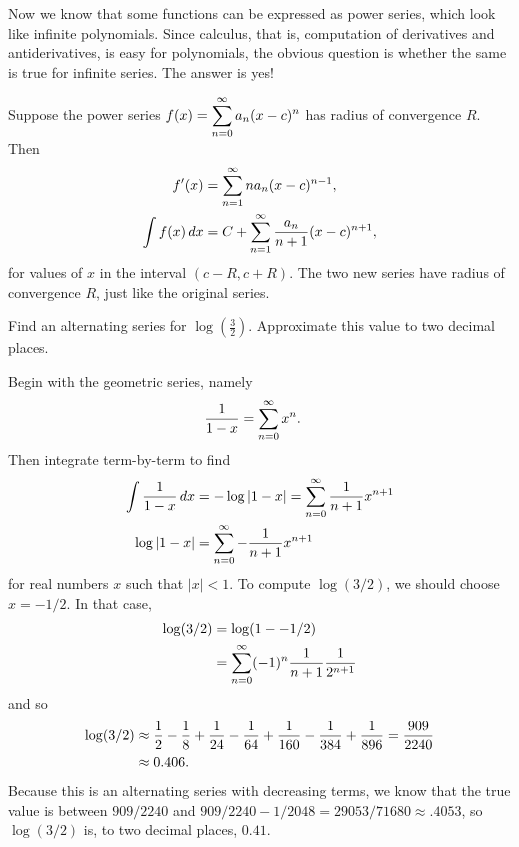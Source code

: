 \nobreak
Now we know that some functions can be expressed as power series,
which look like infinite polynomials. Since calculus, that is,
computation of derivatives and antiderivatives, is easy for
polynomials, the obvious question is whether the same is true
for infinite series. The answer is yes!

\begin{theorem}\label{thm:term-by-term-calculus}
Suppose the power series $f(x)=\displaystyle\sum_{n=0}^\infty a_n(x-c)^n$ has
radius of convergence $R$. Then 
\begin{align*}
  f'(x)&=\sum_{n=1}^\infty na_n(x-c)^{n-1}, \\
  \int f(x)\,dx &= C+\sum_{n=1}^\infty {a_n\over n+1}(x-c)^{n+1}, \\
\end{align*}
for values of $x$ in the interval $(c-R,c+R)$.  The two new series
have radius of convergence $R$, just like the original series.
\end{theorem}


\begin{example}
  \label{example:formula-for-log-three-halves}
  Find an alternating series for $\log \left(\frac{3}{2}\right)$.
  Approximate this value to two decimal places.
\end{example}

\begin{solution}
Begin with the geometric series, namely
\begin{align*}
  {1\over 1-x} &= \sum_{n=0}^\infty x^n.
\end{align*}
Then integrate term-by-term to find
\begin{align*}
  \int{1\over 1-x}\,dx &= -\log|1-x| = \sum_{n=0}^\infty {1\over
    n+1}x^{n+1} \\
  \log|1-x| &= \sum_{n=0}^\infty -{1\over n+1}x^{n+1} \\
\end{align*}
for real numbers $x$ such that $|x|<1$.  To compute $\log(3/2)$, we
should choose $x = -1/2$.  In that case,
\begin{align*}
  \log(3/2)&=\log(1--1/2) \\
  &= \sum_{n=0}^\infty (-1)^n{1\over n+1}{1\over 2^{n+1}}
\end{align*}
and so
\begin{align*}
  \log(3/2) &\approx {1\over 2}-{1\over 8}+{1\over 24}-{1\over 64}
  +{1\over 160}-{1\over 384}+{1\over 896} ={909\over 2240}\\
  &\approx 0.406.
\end{align*}
Because this is an alternating series with decreasing terms,
we know that the true value is between $909/2240$ and
$909/2240-1/2048=29053/71680\approx .4053$, so $\log(3/2)$ is, to two decimal
places, $0.41$. 
\end{solution}

